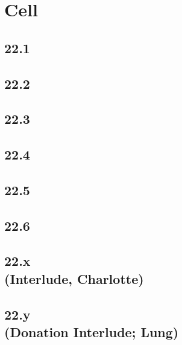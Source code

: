 \part{Cell}
 \chapter{22.1}
 \chapter{22.2}
 \chapter{22.3}
 \chapter{22.4}
 \chapter{22.5}
 \chapter{22.6}
 \chapter[22.x (Interlude, Charlotte)]{22.x\\(Interlude, Charlotte)}
 \chapter[22.y (Donation Interlude; Lung)]{22.y\\(Donation Interlude; Lung)}









